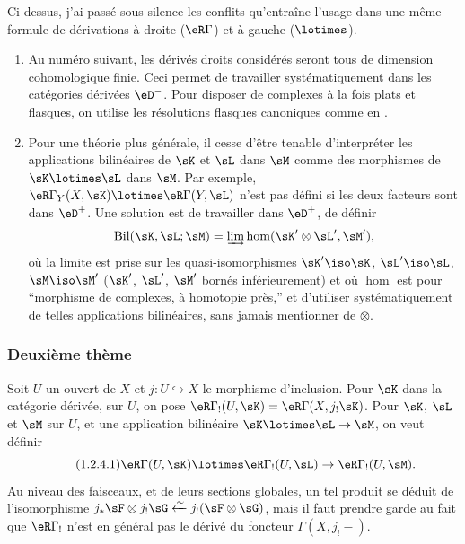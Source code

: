 Ci-dessus, j'ai passé sous silence les conflits qu'entraîne l'usage dans une 
même formule de dérivations à droite ($\eR\Gamma$) et à gauche 
($\lotimes$). 
\begin{enumerate}[\indent a)]
  \item Au numéro suivant, les dérivés droits considérés seront tous 
    de dimension cohomologique finie. Ceci permet de travailler 
    systématiquement dans les catégories dérivées $\eD^-$. Pour disposer 
    de complexes à la fois plats et flasques, on utilise les résolutions 
    flasques canoniques comme en . 
  \item Pour une théorie plus générale, il cesse d'être tenable d'interpréter 
    les applications bilinéaires de $\sK$ et $\sL$ dans $\sM$ comme des 
    morphismes de $\sK\lotimes\sL$ dans $\sM$. Par exemple, 
    $\eR\Gamma_Y(X,\sK)\lotimes\eR\Gamma(Y,\sL)$ n'est pas défini si les deux 
    facteurs sont dans $\eD^+$. Une solution est de travailler dans $\eD^+$, de 
    définir 
    \[
      \operatorname{Bil}(\sK,\sL;\sM) = \varinjlim \hom(\sK'\otimes\sL',\sM') \text{,}
    \]
    où la limite est prise sur les quasi-isomorphismes $\sK'\iso \sK$, 
    $\sL'\iso \sL$, $\sM\iso \sM'$ ($\sK'$, $\sL'$, $\sM'$ bornés 
    inférieurement) et où $\hom$ est pour ``morphisme de complexes, à 
    homotopie près,'' et d'utiliser systématiquement de telles applications 
    bilinéaires, sans jamais mentionner de $\otimes$.  
\end{enumerate}




\subsubsection{Deuxième thème}\label{IV:1-2-4}

Soit $U$ un ouvert de $X$ et $j:U\hookrightarrow X$ le morphisme d'inclusion. 
Pour $\sK$ dans la catégorie dérivée, sur $U$, on pose 
$\eR\Gamma_!(U,\sK)=\eR\Gamma(X,j_!\sK)$. Pour $\sK$, $\sL$ et $\sM$ sur $U$, et 
une application bilinéaire $\sK\lotimes\sL\to\sM$, on veut définir 
\begin{equation*}\tag{1.2.4.1}\label{IV:eq:1-2-4-1}
  \eR\Gamma(U,\sK)\lotimes\eR\Gamma_!(U,\sL)\to\eR\Gamma_!(U,\sM) \text{.}
\end{equation*}
Au niveau des faisceaux, et de leurs sections globales, un tel produit se 
déduit de l'isomorphisme 
$j_*\sF\otimes j_!\sG\xleftarrow\sim j_!(\sF\otimes \sG)$, mais il faut prendre 
garde au fait que $\eR\Gamma_!$ n'est en général pas le dérivé du 
foncteur $\Gamma(X,j_!-)$. 

